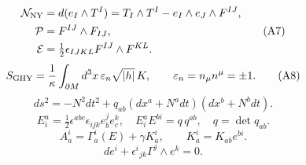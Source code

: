 \documentclass{article}
\begin{document}
\begin{equation}
\begin{aligned}
\mathcal N_{\rm NY}&=d(e_I\wedge T^I)=T_I\wedge T^I-e_I\wedge e_J\wedge F^{IJ},\\
\mathcal P&=F^{IJ}\wedge F_{IJ},\\
\mathcal E&=\tfrac12\epsilon_{IJKL}F^{IJ}\wedge F^{KL}.
\end{aligned}
\tag{A7}
\end{equation}
\begin{equation}
S_{\rm GHY}=\frac1\kappa\int_{\partial M}d^3x\,\varepsilon_n\sqrt{|h|}\,K,\qquad\varepsilon_n=n_\mu n^\mu=\pm1.
\tag{A8}
\end{equation}
\begin{equation}
ds^2=-N^2dt^2+q_{ab}(dx^a+N^adt)(dx^b+N^bdt).
\tag{K1}
\end{equation}
\begin{equation}
E^a_i=\tfrac12\epsilon^{abc}\epsilon_{ijk}e_b^je_c^k,\quad E^a_iE^{bi}=q\,q^{ab},\quad q=\det q_{ab}.
\tag{K2}
\end{equation}
\begin{equation}
A_a^i=\Gamma_a^i(E)+\gamma K_a^i,\qquad K_a^i=K_{ab}e^{bi}.
\tag{K3}
\end{equation}
\begin{equation}
de^i+\epsilon^i{}_{jk}\Gamma^j\wedge e^k=0.
\tag{K4}
\end{equation}
\end{document}
